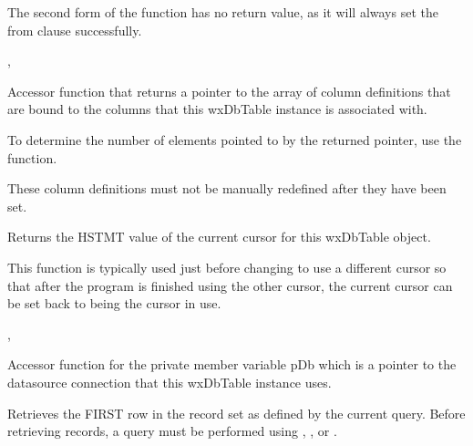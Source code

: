 The second form of the function has no return value, as it will always set 
the from clause successfully. 


, 


\label{wxdbtablegetcoldefs}


Accessor function that returns a pointer to the array of column definitions 
that are bound to the columns that this wxDbTable instance is associated 
with.

To determine the number of elements pointed to by the returned 
 pointer, use the 
 function.


These column definitions must not be manually redefined after they have been 
set.


\label{wxdbtablegetcursor}


Returns the HSTMT value of the current cursor for this wxDbTable object.  


This function is typically used just before changing to use a different cursor 
so that after the program is finished using the other cursor, the current 
cursor can be set back to being the cursor in use.


, 


\label{wxdbtablegetdb}


Accessor function for the private member variable pDb which is a pointer to 
the datasource connection that this wxDbTable instance uses.


\label{wxdbtablegetfirst}


Retrieves the FIRST row in the record set as defined by the current query.  
Before retrieving records, a query must be performed using 
, 
, 
 or 
.

